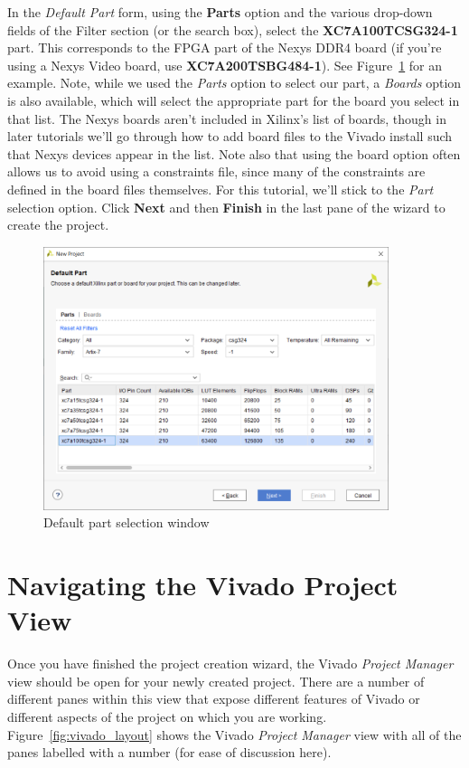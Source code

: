 \documentclass[11pt]{article}
\begin{document}
In the \textit{Default Part} form, using the \textbf{Parts} option and the various drop-down fields of the Filter section (or the search box), select the \textbf{XC7A100TCSG324-1} part. This corresponds to the FPGA part of the Nexys DDR4 board (if you're using a Nexys Video board, use \textbf{XC7A200TSBG484-1}). See Figure~\ref{fig:new_proj_device} for an example. Note, while we used the \textit{Parts} option to select our part, a \textit{Boards} option is also available, which will select the appropriate part for the board you select in that list. The Nexys boards aren't included in Xilinx's list of boards, though in later tutorials we'll go through how to add board files to the Vivado install such that Nexys devices appear in the list. Note also that using the board option often allows us to avoid using a constraints file, since many of the constraints are defined in the board files themselves. For this tutorial, we'll stick to the \textit{Part} selection option. Click \textbf{Next} and then \textbf{Finish} in the last pane of the wizard to create the project.

\begin{figure}[!h]
    \centering
    \includegraphics[width=0.9\textwidth]{images/new_proj_device.png}
    \caption{Default part selection window}
    \label{fig:new_proj_device}
\end{figure}




\section{Navigating the Vivado Project View}
\label{sec:navigating_vivado}
Once you have finished the project creation wizard, the Vivado \textit{Project Manager} view should be open for your newly created project. There are a number of different panes within this view that expose different features of Vivado or different aspects of the project on which you are working. Figure~\ref{fig:vivado_layout} shows the Vivado \textit{Project Manager} view with all of the panes labelled with a number (for ease of discussion here).
\end{document}
